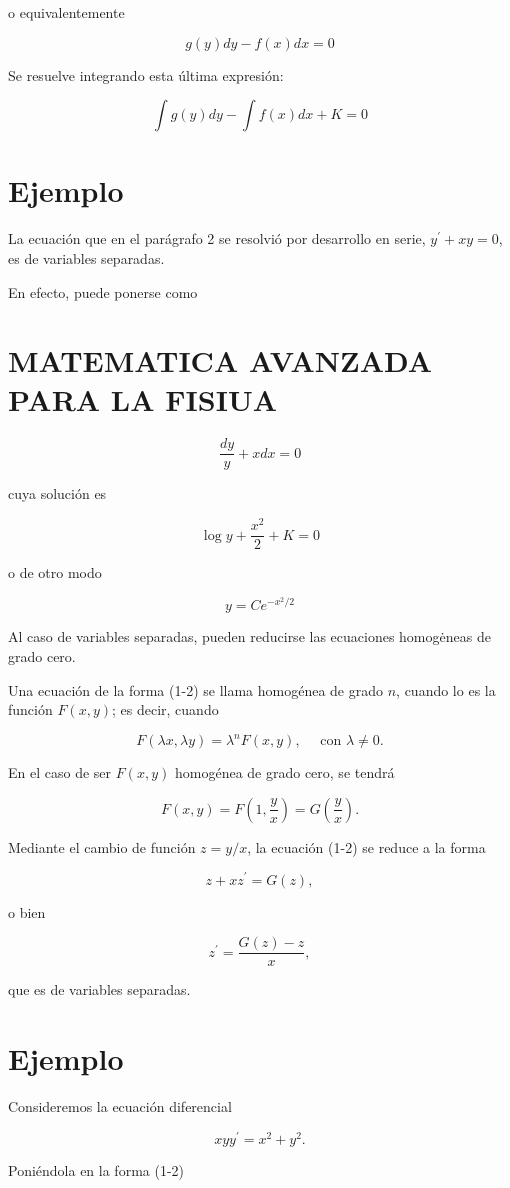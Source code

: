 \documentclass[10pt]{article}
\theoremstyle{plain}
\theoremstyle{definition}
\theoremstyle{remark}
\begin{document}
o equivalentemente

$$
g(y) d y-f(x) d x=0
$$

Se resuelve integrando esta última expresión:

$$
\int g(y) d y-\int f(x) d x+K=0
$$

\section*{Ejemplo}
La ecuación que en el parágrafo 2 se resolvió por desarrollo en serie, $y^{\prime}+x y=0$, es de variables separadas.

En efecto, puede ponerse como

\section*{MATEMATICA AVANZADA PARA LA FISIUA}
$$
\frac{d y}{y}+x d x=0
$$

cuya solución es

$$
\log y+\frac{x^{2}}{2}+K=0
$$

o de otro modo

$$
y=C e^{-x^{2} / 2}
$$

Al caso de variables separadas, pueden reducirse las ecuaciones homogėneas de grado cero.

Una ecuación de la forma (1-2) se llama homogénea de grado $n$, cuando lo es la función $F(x, y)$; es decir, cuando

$$
F(\lambda x, \lambda y)=\lambda^{n} F(x, y), \quad \text { con } \lambda \neq 0 .
$$

En el caso de ser $F(x, y)$ homogénea de grado cero, se tendrá

$$
F(x, y)=F\left(1, \frac{y}{x}\right)=G\left(\frac{y}{x}\right) .
$$

Mediante el cambio de función $z=y / x$, la ecuación (1-2) se reduce a la forma

$$
z+x z^{\prime}=G(z),
$$

o bien

$$
z^{\prime}=\frac{G(z)-z}{x},
$$

que es de variables separadas.

\section*{Ejemplo}
Consideremos la ecuación diferencial

$$
x y y^{\prime}=x^{2}+y^{2} .
$$

Poniéndola en la forma (1-2)
\end{document}
